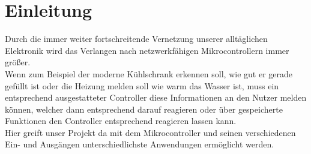 \chapter{Einleitung}

Durch die immer weiter fortschreitende Vernetzung unserer alltäglichen Elektronik
wird das Verlangen nach netzwerkfähigen Mikrocontrollern
immer größer. \\
Wenn zum Beispiel der moderne Kühlschrank erkennen soll, wie gut er gerade
gefüllt ist oder die Heizung melden soll wie warm das Wasser ist, muss ein
entsprechend ausgestatteter Controller diese Informationen an den Nutzer
melden können, welcher dann entsprechend darauf reagieren oder über gespeicherte 
Funktionen den Controller entsprechend reagieren lassen kann.\\ 
Hier greift unser Projekt da mit dem Mikrocontroller und seinen
verschiedenen Ein- und Ausgängen unterschiedlichste Anwendungen ermöglicht
werden.

